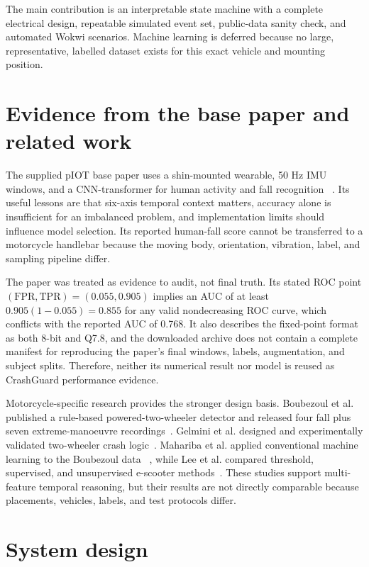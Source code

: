 \documentclass[12pt,a4paper]{article}
\begin{document}
The main contribution is an interpretable state machine with a complete
electrical design, repeatable simulated event set, public-data sanity check,
and automated Wokwi scenarios. Machine learning is deferred because no large,
representative, labelled dataset exists for this exact vehicle and mounting
position.

\section{Evidence from the base paper and related work}

The supplied pIOT base paper uses a shin-mounted wearable, 50 Hz IMU windows,
and a CNN-transformer for human activity and fall recognition
~\cite{tian2026transformer}. Its useful lessons are that six-axis temporal
context matters, accuracy alone is insufficient for an imbalanced problem,
and implementation limits should influence model selection. Its reported
human-fall score cannot be transferred to a motorcycle handlebar because the
moving body, orientation, vibration, label, and sampling pipeline differ.

The paper was treated as evidence to audit, not final truth. Its stated ROC
point $(\mathrm{FPR},\mathrm{TPR})=(0.055,0.905)$ implies an AUC of at least
$0.905(1-0.055)=0.855$ for any valid nondecreasing ROC curve, which conflicts
with the reported AUC of 0.768. It also describes the fixed-point format as
both 8-bit and Q7.8, and the downloaded archive does not contain a complete
manifest for reproducing the paper's final windows, labels, augmentation, and
subject splits. Therefore, neither its numerical result nor model is reused
as CrashGuard performance evidence.

Motorcycle-specific research provides the stronger design basis. Boubezoul
et al. published a rule-based powered-two-wheeler detector and released four
fall plus seven extreme-manoeuvre recordings~\cite{boubezoul2013algorithm,
boubezoul2019dataset}. Gelmini et al. designed and experimentally validated
two-wheeler crash logic~\cite{gelmini2019validation,gelmini2021novel}.
Mahariba et al. applied conventional machine learning to the Boubezoul data
~\cite{mahariba2022ml}, while Lee et al. compared threshold, supervised, and
unsupervised e-scooter methods~\cite{lee2024escooter}. These studies support
multi-feature temporal reasoning, but their results are not directly
comparable because placements, vehicles, labels, and test protocols differ.

\section{System design}
\end{document}
